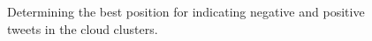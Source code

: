 \documentclass[journal]{vgtc}                %
\begin{document}
\begin{figure}[htp]
  \centering
  \quad
  \quad
\label{main figure label}
\caption{Determining the best position for indicating negative and positive tweets in the cloud clusters.}
\end{figure}
\end{document}

